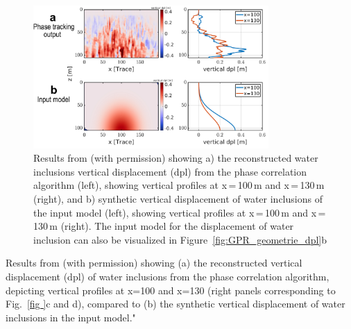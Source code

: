 \begin{figure}[h]
    \centering
    \includegraphics[width=0.8\textwidth]{chapters/Discussion/GPR_dpl_phase.pdf}
    \caption{Results from \cite{Aichele&al2024} (with permission) showing a) the reconstructed water inclusions vertical displacement (dpl) from the phase correlation algorithm (left), showing vertical profiles at x\,=\,100\,m and x\,=\,130\,m (right), and b) synthetic vertical displacement of water inclusions of the input model (left), showing vertical profiles at x\,=\,100\,m and x\,=\,130\,m (right). The input model for the displacement of water inclusion can also be visualized in Figure~\ref{fig:GPR_geometrie_dpl}b}
    \label{fig:GPR_phase}
\end{figure}

Results from \cite{Aichele&al2024} (with permission) showing (a) the reconstructed vertical displacement (dpl) of water inclusions from the phase correlation algorithm, depicting vertical profiles at x=100 and x=130 (right panels corresponding to Fig.~\ref{fig
}c and d), compared to (b) the synthetic vertical displacement of water inclusions in the input model."

